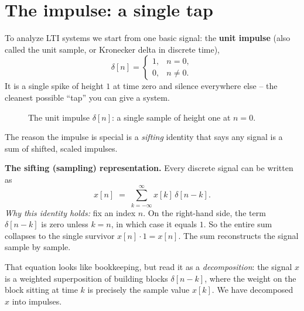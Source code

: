 \section{The impulse: a single tap}
\label{ch12:impulse}

To analyze LTI systems we start from one basic signal: the \textbf{unit impulse}
(also called the unit sample, or Kronecker delta in discrete time),
\[
  \delta[n] = \begin{cases} 1, & n = 0,\\ 0, & n \neq 0. \end{cases}
\]
It is a single spike of height $1$ at time zero and silence everywhere else --
the cleanest possible ``tap'' you can give a system.

\begin{figure}[H]
\centering
{}
\caption{The unit impulse $\delta[n]$: a single sample of height one at $n=0$.}
\label{ch12:fig-impulse}
\end{figure}

The reason the impulse is special is a \emph{sifting} identity that says any
signal is a sum of shifted, scaled impulses.

\begin{formalbox}
\textbf{The sifting (sampling) representation.} Every discrete signal can be
written as
\[
  x[n] \;=\; \sum_{k=-\infty}^{\infty} x[k]\,\delta[n-k].
\]
\emph{Why this identity holds:} fix an index $n$. On the right-hand side, the term
$\delta[n-k]$ is zero unless $k=n$, in which case it equals $1$. So the entire
sum collapses to the single survivor $x[n]\cdot 1 = x[n]$. The sum reconstructs
the signal sample by sample.
\end{formalbox}

That equation looks like bookkeeping, but read it as a \emph{decomposition}: the
signal $x$ is a weighted superposition of building blocks $\delta[n-k]$, where
the weight on the block sitting at time $k$ is precisely the sample value $x[k]$.
We have decomposed $x$ into impulses. 

